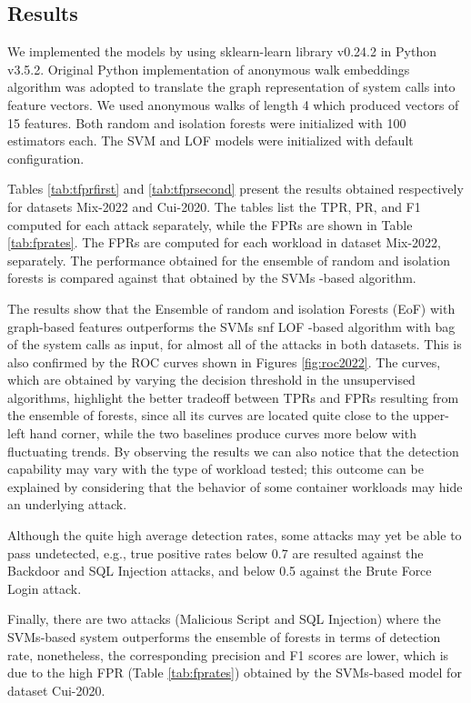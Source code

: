 \subsection{Results}
We implemented the models by using sklearn-learn library v0.24.2 in Python v3.5.2. Original Python implementation of anonymous walk embeddings algorithm \cite{ivanov2018anonymous} was adopted to translate the graph representation of system calls into feature vectors. We used anonymous walks of length 4 which produced vectors of 15 features. Both random and isolation forests were initialized with 100 estimators each. The SVM and LOF models were initialized with default configuration.

Tables \ref{tab:tfprfirst} and \ref{tab:tfprsecond} present the results obtained respectively for datasets Mix-2022 and Cui-2020. The tables list the TPR, PR, and F1 computed for each attack separately, while the FPRs are shown in Table \ref{tab:fprates}. The FPRs are computed for each workload in dataset Mix-2022, separately. The performance obtained for the ensemble of random and isolation forests is compared against that obtained by the SVMs -based algorithm.

The results show that the Ensemble of random and isolation Forests (EoF) with graph-based features outperforms the SVMs snf LOF -based algorithm with bag of the system calls as input, for almost all of the attacks in both datasets. This is also confirmed by the ROC curves shown in Figures \ref{fig:roc2022}. The curves, which are obtained by varying the decision threshold in the unsupervised algorithms, highlight the better tradeoff between TPRs and FPRs resulting from the ensemble of forests, since all its curves are located quite close to the upper-left hand corner, while the two baselines produce curves more below with fluctuating trends. By observing the results we can also notice that the detection capability may vary with the type of workload tested; this outcome can be explained by considering that the behavior of some container workloads may hide an underlying attack.

Although the quite high average detection rates, some attacks may yet be able to pass undetected, e.g., true positive rates below 0.7 are resulted against the Backdoor and SQL Injection attacks, and below 0.5 against the Brute Force Login attack.

Finally, there are two attacks (Malicious Script and SQL Injection) where the SVMs-based system outperforms the ensemble of forests in terms of detection rate, nonetheless, the corresponding precision and F1 scores are lower, which is due to the high FPR (Table \ref{tab:fprates}) obtained by the SVMs-based model for dataset Cui-2020.

